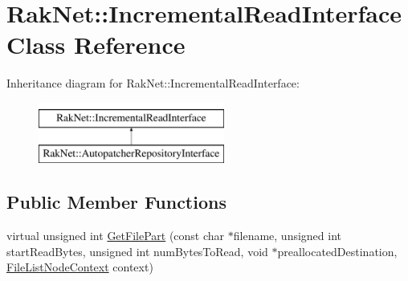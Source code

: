 \hypertarget{class_rak_net_1_1_incremental_read_interface}{\section{Rak\-Net\-:\-:Incremental\-Read\-Interface Class Reference}
\label{class_rak_net_1_1_incremental_read_interface}
}
Inheritance diagram for Rak\-Net\-:\-:Incremental\-Read\-Interface\-:\begin{figure}[H]
\begin{center}
\leavevmode
\includegraphics[height=2.000000cm]{class_rak_net_1_1_incremental_read_interface}
\end{center}
\end{figure}
\subsection*{Public Member Functions}
\begin{DoxyCompactItemize}
\item 
virtual unsigned int \hyperlink{class_rak_net_1_1_incremental_read_interface_a5b27c63c358c8934aac4f6a8ce830622}{Get\-File\-Part} (const char $\ast$filename, unsigned int start\-Read\-Bytes, unsigned int num\-Bytes\-To\-Read, void $\ast$preallocated\-Destination, \hyperlink{struct_file_list_node_context}{File\-List\-Node\-Context} context)
\end{DoxyCompactItemize}


